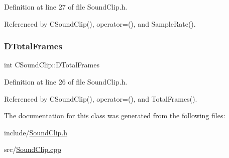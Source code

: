Definition at line 27 of file Sound\+Clip.\+h.



Referenced by C\+Sound\+Clip(), operator=(), and Sample\+Rate().

\hypertarget{classCSoundClip_ab0d9eb261d09fa2a106658276f37285b}{}\label{classCSoundClip_ab0d9eb261d09fa2a106658276f37285b} 
\subsubsection{\texorpdfstring{D\+Total\+Frames}{DTotalFrames}}
{\footnotesize\ttfamily int C\+Sound\+Clip\+::\+D\+Total\+Frames\hspace{0.3cm}{\ttfamily [protected]}}



Definition at line 26 of file Sound\+Clip.\+h.



Referenced by C\+Sound\+Clip(), operator=(), and Total\+Frames().



The documentation for this class was generated from the following files\+:\begin{DoxyCompactItemize}
\item 
include/\hyperlink{SoundClip_8h}{Sound\+Clip.\+h}\item 
src/\hyperlink{SoundClip_8cpp}{Sound\+Clip.\+cpp}\end{DoxyCompactItemize}
